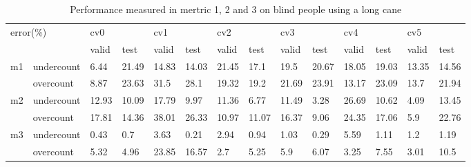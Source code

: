 \documentclass[11pt]{article}
\begin{document}
\begin{table}[]
\centering
\caption{Performance measured in mertric 1, 2 and 3 on blind people using a long cane}
\label{my-label}
\hspace*{-1.5cm}
\begin{tabular}{|l|l|l|l|l|l|l|l|l|l|l|l|l|l|}
\hline
\multicolumn{2}{|l|}{\multirow{2}{*}{error(\%)}} & \multicolumn{2}{l|}{cv0} & \multicolumn{2}{l|}{cv1} & \multicolumn{2}{l|}{cv2} & \multicolumn{2}{l|}{cv3} & \multicolumn{2}{l|}{cv4} & \multicolumn{2}{l|}{cv5} \\ \cline{3-14} 
\multicolumn{2}{|l|}{}                           & valid       & test       & valid       & test       & valid       & test       & valid       & test       & valid       & test       & valid       & test       \\ \hline
\multirow{2}{*}{m1}       & undercount      & 6.44        & 21.49      & 14.83       & 14.03      & 21.45       & 17.1       & 19.5        & 20.67      & 18.05       & 19.03      & 13.35       & 14.56      \\ \cline{2-14} 
                               & overcount       & 8.87        & 23.63      & 31.5        & 28.1       & 19.32       & 19.2       & 21.69       & 23.91      & 13.17       & 23.09      & 13.7        & 21.94      \\ \hline
\multirow{2}{*}{m2}       & undercount      & 12.93       & 10.09      & 17.79       & 9.97       & 11.36       & 6.77       & 11.49       & 3.28       & 26.69       & 10.62      & 4.09        & 13.45      \\ \cline{2-14} 
                               & overcount       & 17.81       & 14.36      & 38.01       & 26.33      & 10.97       & 11.07      & 16.37       & 9.06       & 24.35       & 17.06      & 5.9         & 22.76      \\ \hline
\multirow{2}{*}{m3}       & undercount      & 0.43        & 0.7        & 3.63        & 0.21       & 2.94        & 0.94       & 1.03        & 0.29       & 5.59        & 1.11       & 1.2         & 1.19       \\ \cline{2-14} 
                               & overcount       & 5.32        & 4.96       & 23.85       & 16.57      & 2.7         & 5.25       & 5.9         & 6.07       & 3.25        & 7.55       & 3.01        & 10.5       \\ \hline
\end{tabular}
\end{table}


\nocite{*}




\end{document}
